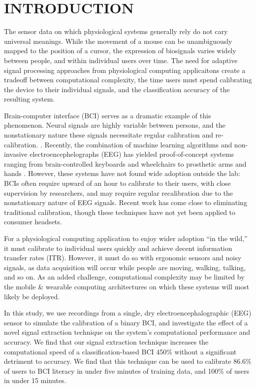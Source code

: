 \section{\uppercase{Introduction}}
\label{sec:introduction}

\noindent The sensor data on which physiological systems generally rely do not cary universal meanings. While the movement of a mouse can be unambiguously mapped to the position of a cursor, the expression of biosignals varies widely  between people, and within individual users over time. The need for adaptive signal processing approaches from physiological computing applicaitons create a tradeoff between computational complexity, the time users must spend calibrating the device to their individual signals, and the classification accuracy of the resulting system.

Brain-computer interface (BCI) serves as a dramatic example of this phenomenon. Neural signals are highly variable between persons, and the nonstationary nature these signals necessitate regular calibration and re-calibration. \cite{dornhege_toward_2007,mcfarland_brain-computer_2011}. Recently, the combination of machine learning algorithms and non-invasive electroencephelographs (EEG) has yielded proof-of-concept systems ranging from brain-controlled keyboards and wheelchairs to prosthetic arms and hands \cite{blankertz_note_2007,millan_combining_2010,d._mattia_brain_2011,hill_practical_2014,campbell_neurophone:_2010}. However, these systems have not found wide adoption outside the lab: BCIs often require upward of an hour to calibrate to their users, with close supervision by researchers, and may require regular recalibration due to the nonstationary nature of EEG signals. \cite{vidaurre_fully_2006,vidaurre_co-adaptive_2011,blankertz_non-invasive_2007} Recent work has come close to eliminating traditional calibration, though these techniques have not yet been applied to consumer headsets. \cite{kindermans_true_2014}

For a physiological computing application to enjoy wider adoption ``in the wild,'' it must calibrate to individual users quickly and achieve decent information transfer rates (ITR). However, it must do so with ergonomic sensors and noisy signals, as data acquisition will occur while people are moving, walking, talking, and so on. As an added challenge, computational complexity may be limited by the mobile \& wearable computing architectures on which these systems will most likely be deployed. 

In this study, we use recordings from a single, dry electroencephalographic (EEG) sensor to simulate the calibration of a binary BCI, and investigate the effect of a novel signal extraction technique on the system's computational performance and accuracy. We find that our signal extraction technique increases the computational speed of a classification-based BCI 450\% without a significant detriment to accuracy. We find that this technique can be used to calibrate 86.6\% of users to BCI literacy in under five minutes of training data, and 100\% of users in under 15 minutes. 